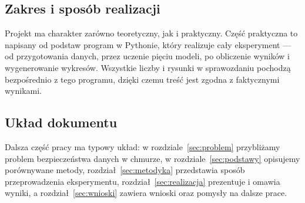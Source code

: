\subsection{Zakres i sposób realizacji}

Projekt ma charakter zarówno teoretyczny, jak i praktyczny. Część praktyczna to
napisany od podstaw program w Pythonie, który realizuje cały eksperyment ---
od przygotowania danych, przez uczenie pięciu modeli, po obliczenie wyników i
wygenerowanie wykresów. Wszystkie liczby i rysunki w sprawozdaniu pochodzą
bezpośrednio z tego programu, dzięki czemu treść jest zgodna z faktycznymi
wynikami.

\subsection{Układ dokumentu}

Dalsza część pracy ma typowy układ: w rozdziale~\ref{sec:problem} przybliżamy
problem bezpieczeństwa danych w chmurze, w rozdziale~\ref{sec:podstawy}
opisujemy porównywane metody, rozdział~\ref{sec:metodyka} przedstawia sposób
przeprowadzenia eksperymentu, rozdział~\ref{sec:realizacja} prezentuje i omawia
wyniki, a rozdział~\ref{sec:wnioski} zawiera wnioski oraz pomysły na dalsze
prace.

